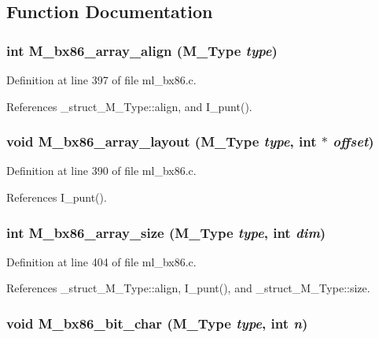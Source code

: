\subsection{Function Documentation}
\subsubsection{\setlength{\rightskip}{0pt plus 5cm}int M\_\-bx86\_\-array\_\-align (\bf{M\_\-Type} {\em type})}\label{m__bx86_8h_984b65e8f07a16bffcbf301daf34f0eb}




Definition at line 397 of file ml\_\-bx86.c.

References \_\-struct\_\-M\_\-Type::align, and I\_\-punt().
\subsubsection{\setlength{\rightskip}{0pt plus 5cm}void M\_\-bx86\_\-array\_\-layout (\bf{M\_\-Type} {\em type}, int $\ast$ {\em offset})}\label{m__bx86_8h_ccb320055614dea9baf9942c8dbd0053}




Definition at line 390 of file ml\_\-bx86.c.

References I\_\-punt().
\subsubsection{\setlength{\rightskip}{0pt plus 5cm}int M\_\-bx86\_\-array\_\-size (\bf{M\_\-Type} {\em type}, int {\em dim})}\label{m__bx86_8h_d924dce73427324c7631f1d80b2b41f8}




Definition at line 404 of file ml\_\-bx86.c.

References \_\-struct\_\-M\_\-Type::align, I\_\-punt(), and \_\-struct\_\-M\_\-Type::size.
\subsubsection{\setlength{\rightskip}{0pt plus 5cm}void M\_\-bx86\_\-bit\_\-char (\bf{M\_\-Type} {\em type}, int {\em n})}\label{m__bx86_8h_21db3f6d223d47a124a35b399acee32e}




